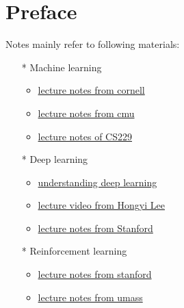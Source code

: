 \chapter*{Preface}

Notes mainly refer to following materials:


\begin{itemize}
    \item[*] Machine learning
    \begin{itemize}
        \item \href{https://www.cs.cornell.edu/courses/cs4780/2023sp/}{lecture notes from cornell}
        \item \href{https://www.cs.cmu.edu/~hn1/documents/machine-learning/notes.pdf}{lecture notes from cmu}
        \item \href{https://cs229.stanford.edu/main_notes.pdf}{lecture notes of CS229}
    \end{itemize}
    \item[*] Deep learning
    \begin{itemize}
        \item \href{https://udlbook.github.io/udlbook/}{understanding deep learning}
        \item \href{https://www.bilibili.com/video/BV1Wv411h7kN/?spm_id_from=333.337.search-card.all.click}{lecture video from Hongyi Lee}
        \item \href{https://cs231n.github.io/}{lecture notes from Stanford}
    \end{itemize}
    \item[*] Reinforcement learning
    \begin{itemize}
        \item \href{https://web.stanford.edu/class/cs234/modules.html}{lecture notes from stanford}
        \item \href{https://people.cs.umass.edu/~bsilva/courses/CMPSCI_687/Fall2022/Lecture_Notes_v1.0_687_F22.pdf}{lecture notes from umass}
    \end{itemize}
\end{itemize}






